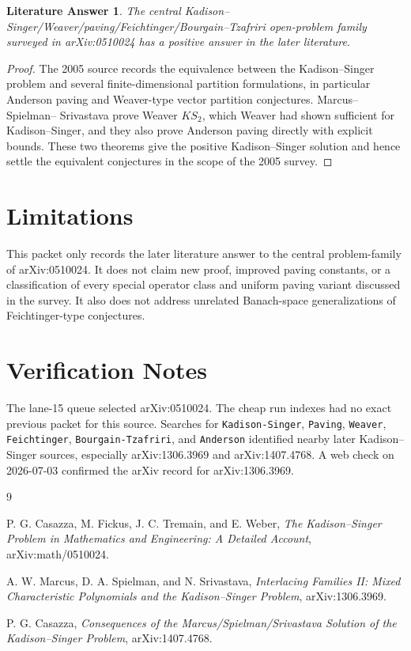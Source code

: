 \documentclass[11pt]{article}
\newtheorem*{theorem}{Literature Answer}
\begin{document}
\begin{theorem}
The central Kadison--Singer/Weaver/paving/Feichtinger/Bourgain--Tzafriri
open-problem family surveyed in arXiv:0510024 has a positive answer in the
later literature.
\end{theorem}

\begin{proof}
The 2005 source records the equivalence between the Kadison--Singer problem
and several finite-dimensional partition formulations, in particular Anderson
paving and Weaver-type vector partition conjectures. Marcus--Spielman--
Srivastava prove Weaver \(KS_2\), which Weaver had shown sufficient for
Kadison--Singer, and they also prove Anderson paving directly with explicit
bounds. These two theorems give the positive Kadison--Singer solution and hence
settle the equivalent conjectures in the scope of the 2005 survey.
\end{proof}

\section*{Limitations}

This packet only records the later literature answer to the central
problem-family of arXiv:0510024. It does not claim new proof, improved paving
constants, or a classification of every special operator class and uniform
paving variant discussed in the survey. It also does not address unrelated
Banach-space generalizations of Feichtinger-type conjectures.

\section*{Verification Notes}

The lane-15 queue selected arXiv:0510024. The cheap run indexes had no exact
previous packet for this source. Searches for \texttt{Kadison-Singer},
\texttt{Paving}, \texttt{Weaver}, \texttt{Feichtinger},
\texttt{Bourgain-Tzafriri}, and \texttt{Anderson} identified nearby later
Kadison--Singer sources, especially arXiv:1306.3969 and arXiv:1407.4768. A web
check on 2026-07-03 confirmed the arXiv record for arXiv:1306.3969.

\begin{thebibliography}{9}

P. G. Casazza, M. Fickus, J. C. Tremain, and E. Weber,
\emph{The Kadison--Singer Problem in Mathematics and Engineering: A Detailed
Account}, arXiv:math/0510024.

A. W. Marcus, D. A. Spielman, and N. Srivastava,
\emph{Interlacing Families II: Mixed Characteristic Polynomials and the
Kadison--Singer Problem}, arXiv:1306.3969.

P. G. Casazza,
\emph{Consequences of the Marcus/Spielman/Srivastava Solution of the
Kadison--Singer Problem}, arXiv:1407.4768.

\end{thebibliography}
\end{document}
